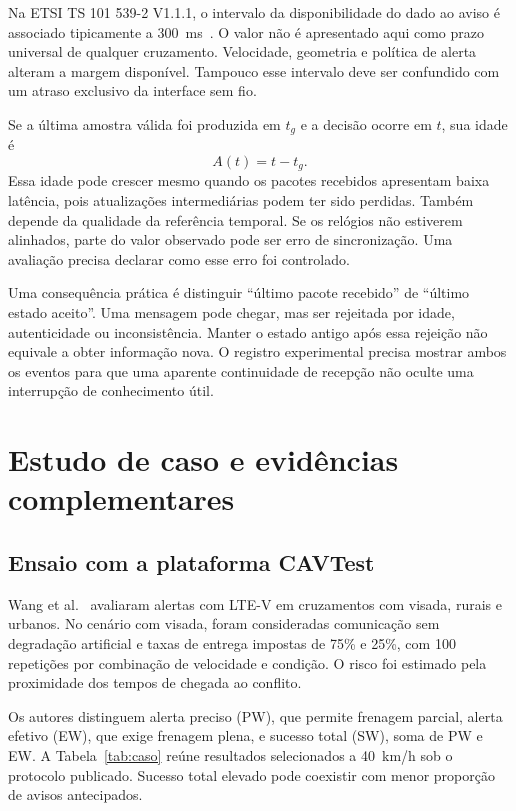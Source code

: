 \documentclass[conference,a4paper]{IEEEtran}
\begin{document}
Na ETSI TS 101 539-2 V1.1.1, o intervalo da disponibilidade do dado ao aviso é associado tipicamente a 300~ms~\cite{etsiICRW2018}. O valor não é apresentado aqui como prazo universal de qualquer cruzamento. Velocidade, geometria e política de alerta alteram a margem disponível. Tampouco esse intervalo deve ser confundido com um atraso exclusivo da interface sem fio.

Se a última amostra válida foi produzida em $t_g$ e a decisão ocorre em $t$, sua idade é
\begin{equation}
 A(t)=t-t_g.
 \label{eq:idade}
\end{equation}
Essa idade pode crescer mesmo quando os pacotes recebidos apresentam baixa latência, pois atualizações intermediárias podem ter sido perdidas. Também depende da qualidade da referência temporal. Se os relógios não estiverem alinhados, parte do valor observado pode ser erro de sincronização. Uma avaliação precisa declarar como esse erro foi controlado.

Uma consequência prática é distinguir ``último pacote recebido'' de ``último estado aceito''. Uma mensagem pode chegar, mas ser rejeitada por idade, autenticidade ou inconsistência. Manter o estado antigo após essa rejeição não equivale a obter informação nova. O registro experimental precisa mostrar ambos os eventos para que uma aparente continuidade de recepção não oculte uma interrupção de conhecimento útil.

\section{Estudo de caso e evidências complementares}
\subsection{Ensaio com a plataforma CAVTest}
Wang et al.~\cite{wang2021} avaliaram alertas com LTE-V em cruzamentos com visada, rurais e urbanos. No cenário com visada, foram consideradas comunicação sem degradação artificial e taxas de entrega impostas de 75\% e 25\%, com 100 repetições por combinação de velocidade e condição. O risco foi estimado pela proximidade dos tempos de chegada ao conflito.

Os autores distinguem alerta preciso (PW), que permite frenagem parcial, alerta efetivo (EW), que exige frenagem plena, e sucesso total (SW), soma de PW e EW. A Tabela~\ref{tab:caso} reúne resultados selecionados a 40~km/h sob o protocolo publicado. Sucesso total elevado pode coexistir com menor proporção de avisos antecipados.
\end{document}
